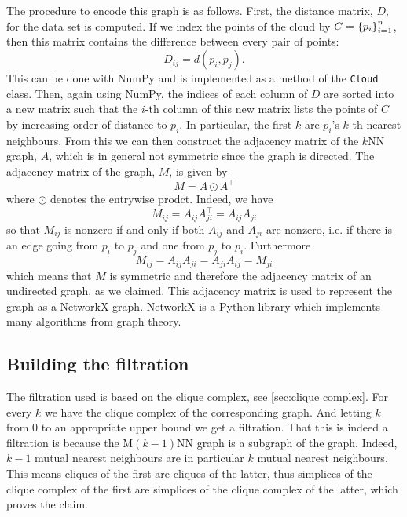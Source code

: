 \documentclass[../main.tex]{subfiles}
\begin{document}
The procedure to encode this graph is as follows. First, the distance matrix, \( D \), for
the data set is computed. If we index the points of the cloud by \( C = \left\{ p_i \right\}_{i =
1}^n \), then this matrix contains the difference between every pair of points:
\begin{equation*}
	D_{ij} = d(p_i, p_j). 
\end{equation*}
This can be done with \textsf{NumPy} and is implemented as a method of the \texttt{Cloud}
class. Then, again using \textsf{NumPy}, the indices of each
column of \( D \) are sorted into a new matrix such that the \( i \)-th column of this new
matrix lists the points of \( C \) by increasing order of distance to \( p_i \). In
particular, the first \( k \) are \( p_i \)'s \( k \)-th nearest neighbours. From this we
can then construct the adjacency matrix of the \( k \)NN graph, \( A \), which is in
general not symmetric since the graph is directed. The adjacency matrix of the \MKNN
graph, \( M \), is given by
\begin{equation*}
	M = A \odot A^\top
\end{equation*}
where \( \odot \) denotes the entrywise prodct. Indeed, we have
\begin{equation*}
	M_{ij} = A_{ij}A^\top_{ji} = A_{ij}A_{ji}
\end{equation*}
so that \( M_{ij} \) is nonzero if and only if both \( A_{ij} \) and \( A_{ji} \) are
nonzero, i.e. if there is an edge going from \( p_i \) to \( p_j \) and one from \( p_j	\) to \( p_i \). Furthermore 
\begin{equation*}
	M_{ij} = A_{ij}A_{ji} = A_{ji}A_{ij} = M_{ji}
\end{equation*}
which means that \( M \) is symmetric and therefore the adjacency matrix of an undirected
graph, as we claimed. This adjacency matrix is used to represent the \MKNN graph as a
\textsf{NetworkX} graph. \textsf{NetworkX} is a Python library which implements many
algorithms from graph theory. 

\subsection{Building the filtration}
The filtration used is based on the clique complex, see \cref{sec:clique complex}. For
every \( k \) we have the clique complex of the corresponding \MKNN graph. And letting
\( k \) from 0 to an appropriate upper bound we get a filtration. That this is indeed a
filtration is because the M\( (k-1) \)NN graph is a subgraph of the \MKNN graph. Indeed,
\( k-1 \) mutual nearest neighbours are in particular \( k \) mutual nearest neighbours.
This means cliques of the first are cliques of the latter, thus simplices of the clique
complex of the first are simplices of the clique complex of the latter, which proves the
claim. 
\end{document}
